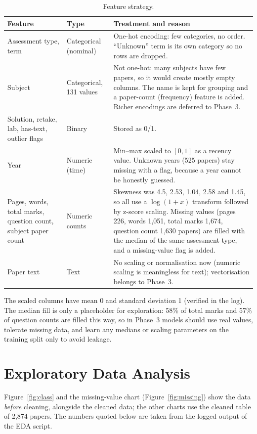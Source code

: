 \documentclass[11pt,a4paper]{article}
\begin{document}
\begin{table}[H]
\centering
\caption{Feature strategy.}
\label{tab:features}
\small
\begin{tabularx}{\linewidth}{>{\raggedright\arraybackslash}p{3.1cm}>{\raggedright\arraybackslash}p{2.6cm}>{\raggedright\arraybackslash}X}
\toprule
Feature & Type & Treatment and reason \\
\midrule
Assessment type, term & Categorical (nominal) & One-hot encoding: few categories, no order. ``Unknown'' term is its own category so no rows are dropped. \\
Subject & Categorical, 131 values & Not one-hot: many subjects have few papers, so it would create mostly empty columns. The name is kept for grouping and a paper-count (frequency) feature is added. Richer encodings are deferred to Phase~3. \\
Solution, retake, lab, has-text, outlier flags & Binary & Stored as 0/1. \\
Year & Numeric (time) & Min--max scaled to $[0,1]$ as a recency value. Unknown years (525 papers) stay missing with a flag, because a year cannot be honestly guessed. \\
Pages, words, total marks, question count, subject paper count & Numeric counts & Skewness was 4.5, 2.53, 1.04, 2.58 and 1.45, so all use a $\log(1+x)$ transform followed by z-score scaling. Missing values (pages 226, words 1{,}051, total marks 1{,}674, question count 1{,}630 papers) are filled with the median of the same assessment type, and a missing-value flag is added. \\
Paper text & Text & No scaling or normalisation now (numeric scaling is meaningless for text); vectorisation belongs to Phase~3. \\
\bottomrule
\end{tabularx}
\end{table}

The scaled columns have mean 0 and standard deviation 1 (verified in the log). The median fill is only a placeholder for exploration: 58\% of total marks and 57\% of question counts are filled this way, so in Phase~3 models should use real values, tolerate missing data, and learn any medians or scaling parameters on the training split only to avoid leakage.

\section{Exploratory Data Analysis}
\label{sec:eda}
Figure~\ref{fig:class} and the missing-value chart (Figure~\ref{fig:missing}) show the data \emph{before} cleaning, alongside the cleaned data; the other charts use the cleaned table of 2{,}874 papers. The numbers quoted below are taken from the logged output of the EDA script.
\end{document}
